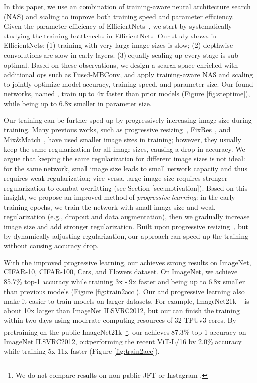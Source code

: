 \documentclass{article}
\begin{document}
In this paper, we use an combination of training-aware neural architecture search (NAS) and scaling  to improve both training speed and parameter efficiency. Given the parameter efficiency of EfficientNets~\cite{efficientnet19}, we start by systematically studying the training bottlenecks in EfficientNets. Our study shows in EfficientNets: (1) training with very large image sizes is slow; (2) depthwise convolutions are slow in early layers. (3) equally scaling up every stage is sub-optimal. Based on these observations, we design a search space enriched with additional ops such as Fused-MBConv, and apply training-aware NAS and scaling to jointly optimize model accuracy, training speed, and parameter size. Our found networks, named \emph{{\xnet}}, train up to 4x faster than prior models (Figure \ref{fig:steptime}), while being up to 6.8x smaller in parameter size.


Our training can be further sped up by progressively increasing image size during training. Many previous works, such as progressive resizing~\cite{fastaidawnbench}, FixRes~\cite{fixres20}, and Mix\&Match~\cite{mixmatch19}, have used smaller image sizes in training; however, they usually keep the same regularization for all image sizes, causing a drop in accuracy. We argue that keeping the same regularization for different image sizes is not ideal: for the same network, small image size leads to small network capacity and thus requires weak
regularization; vice versa, large image size requires stronger regularization to combat overfitting (see Section \ref{sec:motivation}). Based on this insight, we propose an improved method of \emph{progressive learning}: in the early training epochs, we train the network with small image size and weak regularization (e.g., dropout and data augmentation), then we gradually increase  image size and add stronger regularization. Built upon progressive resizing~\cite{fastaidawnbench}, but by dynamically adjusting regularization, our approach can speed up the training without causing accuracy drop.






With the improved progressive learning, our {\xnet} achieves 
strong results  on ImageNet, CIFAR-10, CIFAR-100, Cars, and Flowers dataset. On ImageNet, we achieve 85.7\% top-1 accuracy while training 3x - 9x faster and being up to 6.8x smaller than previous models (Figure \ref{fig:train2acc}). 
Our {\xnet} and progressive learning also make it easier to train models on larger datasets. For example, ImageNet21k ~\cite{imagenet15} is about 10x larger than ImageNet ILSVRC2012, but our {\xnet} can finish the training within two days using moderate computing resources of 32 TPUv3 cores. By pretraining on the public ImageNet21k~\footnote{We do not compare results on non-public  JFT or Instagram .}, our {\xnet} achieves 87.3\% top-1 accuracy on ImageNet ILSVRC2012, outperforming the recent ViT-L/16 by 2.0\% accuracy while training 5x-11x faster (Figure \ref{fig:train2acc}).
\end{document}
